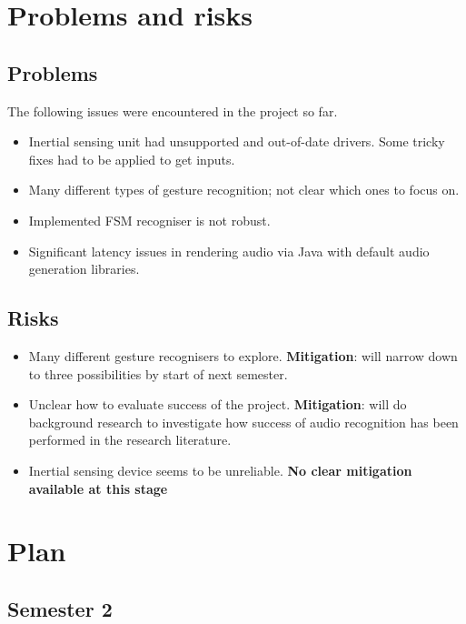 \documentclass[11pt]{article}
\providecommand{\tightlist}{%
\setlength{\itemsep}{0pt}\setlength{\parskip}{0pt}}
\begin{document}
\section{Problems and risks}\label{problems-and-risks}

\subsection{Problems}\label{problems}

The following issues were encountered in the project so far.
\begin{itemize}
    \tightlist
\item Inertial sensing unit had unsupported and out-of-date drivers. Some tricky
fixes had to be applied to get inputs.
\item Many different types of gesture recognition; not clear which ones to focus
on.
\item Implemented FSM recogniser is not robust.
\item Significant latency issues in rendering audio via Java with default audio
generation libraries.
\end{itemize}

\subsection{Risks}\label{risks}

\begin{itemize}
\tightlist
\item   Many different gesture recognisers to explore. \textbf{Mitigation}: will narrow
down to three possibilities by start of next semester.
\item Unclear how to evaluate success of the project. \textbf{Mitigation}: will do
background research to investigate how success of audio recognition has
been performed in the research literature.
\item Inertial sensing device seems to be unreliable. \textbf{No clear mitigation available at this stage}
\end{itemize}
    
\section{Plan}\label{plan}

\subsection{Semester 2}
\end{document}
